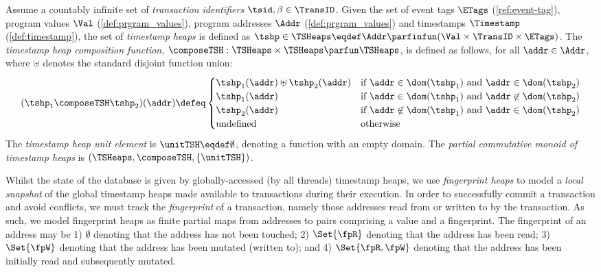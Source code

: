 \begin{defn}
\label{def:timestamp_heaps}
Assume a countably infinite set of \emph{transaction identifiers} $\tsid, \beta \in \TransID$.
Given the set of event tags $\ETags$ (\ref{ref:event-tag}), program values $\Val$ (\ref{def:prgram_values}), program addresses $\Addr$ (\ref{def:prgram_values}) and timestamps \(\Timestamp\) (\ref{def:timestamp}), the set of \emph{timestamp heaps} is defined as $\tshp \in \TSHeaps \eqdef \Addr \parfinfun (\Val \times \TransID \times \ETags)$.
The \emph{timestamp heap composition function}, $\composeTSH: \TSHeaps \times \TSHeaps \parfun \TSHeaps$, is defined as follows, for all $\addr \in \Addr$, where $\uplus$ denotes the standard disjoint function union:
%
\[
	(\tshp_1 \composeTSH \tshp_2)(\addr) \defeq 
	\begin{cases}
		\tshp_1(\addr) \uplus \tshp_2(\addr) & \text{if } \addr \in \dom(\tshp_1) \text{ and } \addr \in \dom(\tshp_2) \\
		\tshp_1(\addr) & \text{if } \addr \in \dom(\tshp_1) \text{ and } \addr \not\in \dom(\tshp_2) \\
		\tshp_2(\addr) & \text{if } \addr \not\in \dom(\tshp_1) \text{ and } \addr \in \dom(\tshp_2) \\
		\text{undefined} & \text{otherwise}
	\end{cases}
\]
%
The \emph{timestamp heap unit element} is $\unitTSH \eqdef \emptyset$, denoting a function with an empty domain.
The \emph{partial commutative monoid of timestamp heaps} is $(\TSHeaps, \composeTSH, \{\unitTSH\})$. 
\end{defn}
 
Whilst the state of the database is given by globally-accessed (by all threads) timestamp heaps, we use \emph{fingerprint heaps} to model a \emph{local snapshot} of the global timestamp heaps made available to transactions during their execution. 
In order to successfully commit a transaction and avoid conflicts, we must track the \emph{fingerprint} of a transaction, namely those addresses read from or written to by the transaction.
As such, we model fingerprint heaps as finite partial maps from addresses to pairs comprising a value and a fingerprint.
The fingerprint of an address may be 1) $\emptyset$ denoting that the address has not been touched;
2) $\Set{\fpR}$ denoting that the address has been read;
3) $\Set{\fpW}$ denoting that the address has been mutated (written to);
and 4) $\Set{\fpR, \fpW}$ denoting that the address has been initially read and subsequently mutated.   
%

